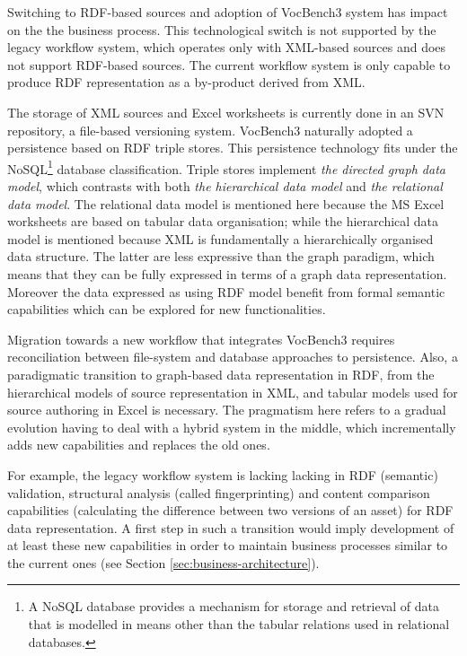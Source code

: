 	Switching to RDF-based sources and adoption of VocBench3 system has impact on the the business process. This technological switch is not supported by the legacy workflow system, which operates only with XML-based sources and does not support RDF-based sources. The current workflow system is only capable to produce RDF representation as a by-product derived from XML. 
	
	The storage of XML sources and Excel worksheets is currently done in an SVN repository, a file-based versioning system. VocBench3 naturally adopted a persistence based on RDF triple stores. This persistence technology fits under the NoSQL\footnote{A NoSQL database provides a mechanism for storage and retrieval of data that is modelled in means other than the tabular relations used in relational databases.} database classification. Triple stores implement \textit{the directed graph data model}, which contrasts with both \textit{the hierarchical data model} and \textit{the relational data model}. The relational data model is mentioned here because the MS Excel worksheets are based on tabular data organisation; while the hierarchical data model is mentioned because XML is fundamentally a hierarchically organised data structure. The latter are less expressive than the graph paradigm, which means that they can be fully expressed in terms of a graph data representation. Moreover the data expressed as using RDF model benefit from formal semantic capabilities \citep{rdf-semantics} which can be explored for new functionalities. 
	
	Migration towards a new workflow that integrates VocBench3 requires reconciliation between file-system and database approaches to persistence. Also, a paradigmatic transition to graph-based data representation in RDF, from the hierarchical models of source representation in XML, and tabular models used for source authoring in Excel is necessary. The pragmatism here refers to a gradual evolution having to deal with a hybrid system in the middle, which incrementally adds new capabilities and replaces the old ones.
	 
	For example, the legacy workflow system is lacking lacking in RDF (semantic) validation, structural analysis (called fingerprinting) and content comparison capabilities (calculating the difference between two versions of an asset) for RDF data representation. A first step in such a transition would imply development of at least these new capabilities in order to maintain business processes similar to the current ones (see Section \ref{sec:business-architecture}). 
	
